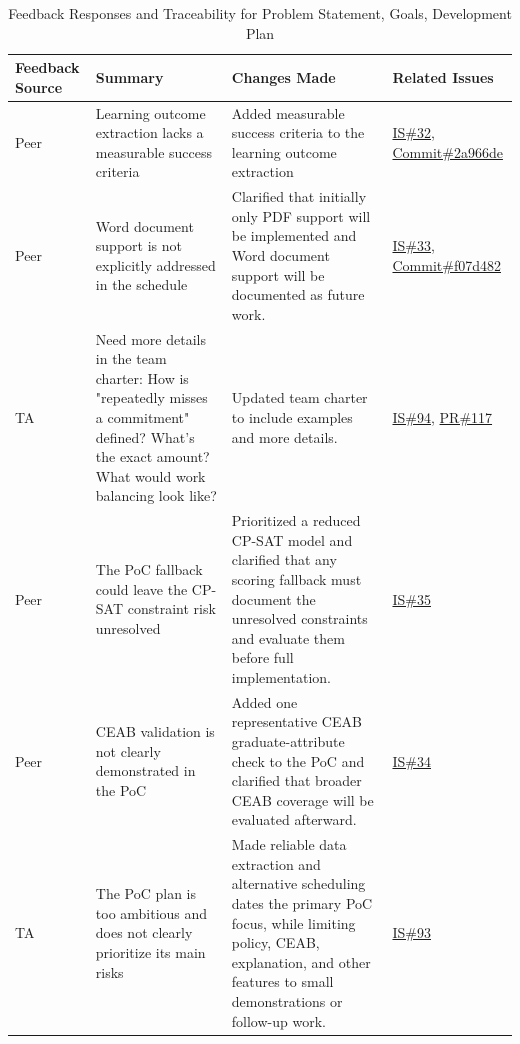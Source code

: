 \documentclass{article}
\begin{document}
\begin{longtable}{|p{2cm}|p{4cm}|p{5cm}|p{4cm}|}
\caption{Feedback Responses and Traceability for Problem Statement, Goals, Development Plan}
\label{Tbl-ProbState}\\

\hline
\textbf{Feedback Source} & \textbf{Summary} & \textbf{Changes Made} & \textbf{Related Issues} \\ 
\hline
\endhead

Peer & Learning outcome extraction lacks a measurable success criteria & Added measurable success criteria to the learning outcome extraction & \href{https://github.com/shivyam/cas-course-optimization/issues/32}{IS\#32}, \href{https://github.com/shivyam/cas-course-optimization/commit/2a966de}{Commit\#2a966de} \\
\hline
Peer & Word document support is not explicitly addressed in the schedule & Clarified that initially only PDF support will be implemented and Word document support will be documented as future work. & \href{https://github.com/shivyam/cas-course-optimization/issues/33}{IS\#33}, \href{https://github.com/shivyam/cas-course-optimization/commit/f07d482}{Commit\#f07d482} \\
\hline
TA & Need more details in the team charter: How is "repeatedly misses a commitment" defined? What's the exact amount? What would work balancing look like? & Updated team charter to include examples and more details. & \href{https://github.com/shivyam/cas-course-optimization/issues/94}{IS\#94}, \href{https://github.com/shivyam/cas-course-optimization/pull/117}{PR\#117} \\
\hline
Peer & The PoC fallback could leave the CP-SAT constraint risk unresolved & Prioritized a reduced CP-SAT model and clarified that any scoring fallback must document the unresolved constraints and evaluate them before full implementation. & \href{https://github.com/shivyam/cas-course-optimization/issues/35}{IS\#35} \\
\hline
Peer & CEAB validation is not clearly demonstrated in the PoC & Added one representative CEAB graduate-attribute check to the PoC and clarified that broader CEAB coverage will be evaluated afterward. & \href{https://github.com/shivyam/cas-course-optimization/issues/34}{IS\#34} \\
\hline
TA & The PoC plan is too ambitious and does not clearly prioritize its main risks & Made reliable data extraction and alternative scheduling dates the primary PoC focus, while limiting policy, CEAB, explanation, and other features to small demonstrations or follow-up work. & \href{https://github.com/shivyam/cas-course-optimization/issues/93}{IS\#93} \\

\end{longtable}
\end{document}
